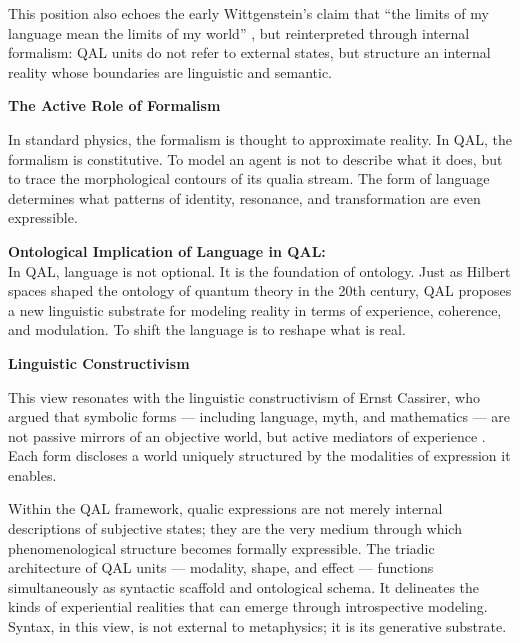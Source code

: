 \documentclass[11pt]{article}
\numberwithin{equation}{section} %
\begin{document}
This position also echoes the early Wittgenstein’s claim that “the limits of my language mean the limits of my world” \cite{wittgenstein1922tractatus}, but reinterpreted through internal formalism: QAL units do not refer to external states, but structure an internal reality whose boundaries are linguistic and semantic.

\bigskip

\noindent\textbf{The Active Role of Formalism}

In standard physics, the formalism is thought to approximate reality. In QAL, the formalism is constitutive. To model an agent is not to describe what it does, but to trace the morphological contours of its qualia stream. The form of language determines what patterns of identity, resonance, and transformation are even expressible.


\begin{mdframed}[backgroundcolor=blue!10, linecolor=black]
\small
\textbf{Ontological Implication of Language in QAL:} \\
In QAL, language is not optional. It is the foundation of ontology. Just as Hilbert spaces shaped the ontology of quantum theory in the 20th century, QAL proposes a new linguistic substrate for modeling reality in terms of experience, coherence, and modulation. To shift the language is to reshape what is real.
\end{mdframed}

\bigskip

\noindent\textbf{Linguistic Constructivism}

This view resonates with the linguistic constructivism of Ernst Cassirer, who argued that symbolic forms — including language, myth, and mathematics — are not passive mirrors of an objective world, but active mediators of experience \cite{cassirer1955philosophy}. Each form discloses a world uniquely structured by the modalities of expression it enables.

Within the QAL framework, qualic expressions are not merely internal descriptions of subjective states; they are the very medium through which phenomenological structure becomes formally expressible. The triadic architecture of QAL units — modality, shape, and effect — functions simultaneously as syntactic scaffold and ontological schema. It delineates the kinds of experiential realities that can emerge through introspective modeling. Syntax, in this view, is not external to metaphysics; it is its generative substrate.

\bigskip
\end{document}
